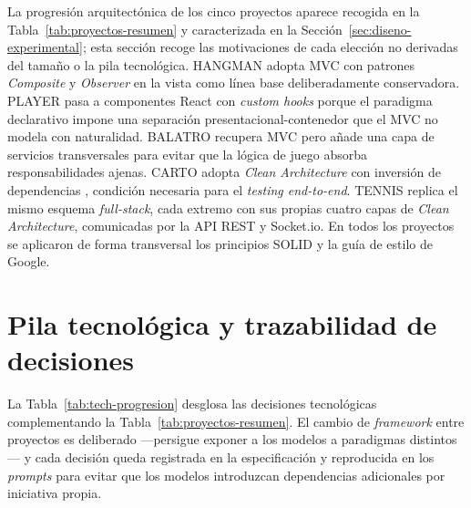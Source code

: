 La progresión arquitectónica de los cinco proyectos aparece recogida en la Tabla~\ref{tab:proyectos-resumen} y caracterizada en la Sección~\ref{sec:diseno-experimental}; esta sección recoge las motivaciones de cada elección no derivadas del tamaño o la pila tecnológica. \ac{HANGMAN} adopta \ac{MVC} \cite{Reenskaug:1979:MVC} con patrones \textit{Composite} y \textit{Observer} \cite{Gamma:1994:Design} en la vista como línea base deliberadamente conservadora. \ac{PLAYER} pasa a componentes React con \textit{custom hooks} porque el paradigma declarativo impone una separación presentacional-contenedor que el \ac{MVC} no modela con naturalidad. \ac{BALATRO} recupera \ac{MVC} pero añade una capa de servicios transversales para evitar que la lógica de juego absorba responsabilidades ajenas. \ac{CARTO} adopta \textit{Clean Architecture} \cite{Martin:2018:CleanArchitecture} con inversión de dependencias \cite{Martin:2003:Agile}, condición necesaria para el \textit{testing end-to-end}. \ac{TENNIS} replica el mismo esquema \textit{full-stack}, cada extremo con sus propias cuatro capas de \textit{Clean Architecture}, comunicadas por la \ac{API} REST y Socket.io. En todos los proyectos se aplicaron de forma transversal los principios \ac{SOLID} \cite{Martin:2003:Agile} y la guía de estilo de Google.

\section{Pila tecnológica y trazabilidad de decisiones} \label{sec:tech-stack}

La Tabla~\ref{tab:tech-progresion} desglosa las decisiones tecnológicas complementando la Tabla~\ref{tab:proyectos-resumen}. El cambio de \textit{framework} entre proyectos es deliberado —persigue exponer a los modelos a paradigmas distintos— y cada decisión queda registrada en la especificación y reproducida en los \textit{prompts} para evitar que los modelos introduzcan dependencias adicionales por iniciativa propia.

